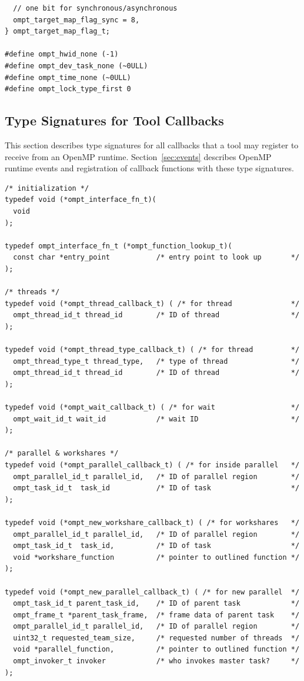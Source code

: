 \documentclass{article}
\begin{document}
{\begin{verbatim}
  // one bit for synchronous/asynchronous
  ompt_target_map_flag_sync = 8,   
} ompt_target_map_flag_t;

#define ompt_hwid_none (-1)
#define ompt_dev_task_none (~0ULL)
#define ompt_time_none (~0ULL)
#define ompt_lock_type_first 0
\end{verbatim}
\clearpage

\subsection{Type Signatures for Tool Callbacks}
\label{appendix:ompt-types:callbacks}
This section describes type signatures for all  callbacks that a tool may register to receive from an OpenMP runtime. Section~\ref{sec:events} describes OpenMP runtime events and registration of
callback functions with these type signatures.

\begin{verbatim}
/* initialization */
typedef void (*ompt_interface_fn_t)(
  void
);

typedef ompt_interface_fn_t (*ompt_function_lookup_t)(
  const char *entry_point           /* entry point to look up       */
);

/* threads */	
typedef void (*ompt_thread_callback_t) ( /* for thread              */	   
  ompt_thread_id_t thread_id        /* ID of thread                 */
);

typedef void (*ompt_thread_type_callback_t) ( /* for thread         */
  ompt_thread_type_t thread_type,   /* type of thread               */	   
  ompt_thread_id_t thread_id        /* ID of thread                 */
);
	
typedef void (*ompt_wait_callback_t) ( /* for wait                  */
  ompt_wait_id_t wait_id            /* wait ID                      */
);
	
/* parallel & workshares */
typedef void (*ompt_parallel_callback_t) ( /* for inside parallel   */			   
  ompt_parallel_id_t parallel_id,   /* ID of parallel region        */
  ompt_task_id_t  task_id           /* ID of task                   */
);								    

typedef void (*ompt_new_workshare_callback_t) ( /* for workshares   */			   
  ompt_parallel_id_t parallel_id,   /* ID of parallel region        */
  ompt_task_id_t  task_id,          /* ID of task                   */
  void *workshare_function          /* pointer to outlined function */
);								    
							   	    
typedef void (*ompt_new_parallel_callback_t) ( /* for new parallel  */
  ompt_task_id_t parent_task_id,    /* ID of parent task            */
  ompt_frame_t *parent_task_frame,  /* frame data of parent task    */
  ompt_parallel_id_t parallel_id,   /* ID of parallel region        */
  uint32_t requested_team_size,     /* requested number of threads  */
  void *parallel_function,          /* pointer to outlined function */
  ompt_invoker_t invoker            /* who invokes master task?     */
);
  

\end{verbatim}}
\end{document}
